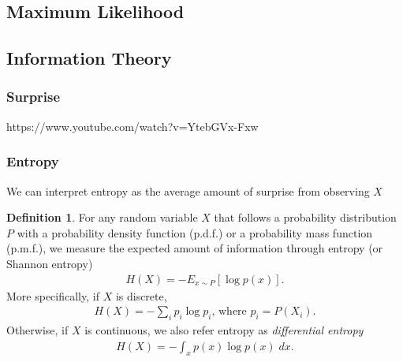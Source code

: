 \documentclass[a4paper,12pt]{article}
\theoremstyle{definition}
\newtheorem*{definition}{Definition}
\begin{document}
\subsection{Maximum Likelihood}
\subsection{Information Theory}
\subsubsection*{Surprise}
https://www.youtube.com/watch?v=YtebGVx-Fxw
\subsubsection*{Entropy}
    We can interpret entropy as the average amount of surprise from observing $X$
\begin{definition}
    For any random variable $X$ that follows a probability distribution $P$ 
    with a probability density function (p.d.f.) or a probability mass function (p.m.f.), 
    we measure the expected amount of information through entropy (or Shannon entropy)
    \begin{align*}
        H(X) = - E_{x \sim P} [\log p(x)].
    \end{align*}
    More specifically, if $X$ is discrete,
    \begin{align*}
        H(X) = - \sum_i p_i \log p_i \text{, where } p_i = P(X_i).
    \end{align*}
    Otherwise, if $X$ is continuous, we also refer entropy as \emph{differential entropy}
    \begin{align*}
        H(X) = - \int_x p(x) \log p(x) \; dx.
    \end{align*}
\end{definition}
\end{document}
